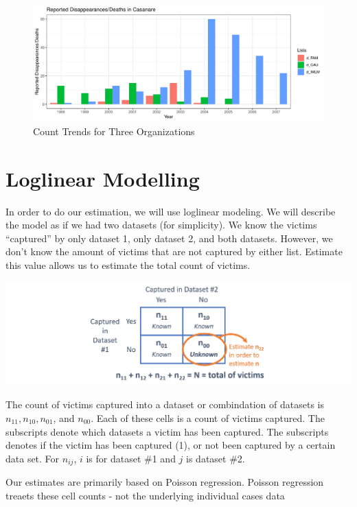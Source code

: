 \documentclass[]{article}
\begin{document}
\begin{figure}
\centering
\includegraphics{Categorical-FinalProject_files/figure-latex/unnamed-chunk-1-1.pdf}
\caption{Count Trends for Three Organizations}
\end{figure}

\hypertarget{loglinear-modelling}{%
\section{Loglinear Modelling}\label{loglinear-modelling}}

In order to do our estimation, we will use loglinear modeling. We will
describe the model as if we had two datasets (for simplicity). We know
the victims ``captured'' by only dataset 1, only dataset 2, and both
datasets. However, we don't know the amount of victims that are not
captured by either list. Estimate this value allows us to estimate the
total count of victims.

\includegraphics{Categorical-FinalProject_files/figure-latex/img.example-1.pdf}

The count of victims captured into a dataset or combindation of datasets
is \(n_{11}, n_{10}, n_{01}\), and \(n_{00}\). Each of these cells is a
count of victims captured. The subscripts denote which datasets a victim
has been captured. The subscripts denotes if the victim has been
captured (1), or not been captured by a certain data set. For
\(n_{ij}\), \(i\) is for dataset \#1 and \(j\) is dataset \#2.

Our estimates are primarily based on Poisson regression. Poisson
regression treaets these cell counts - not the underlying individual
cases data
\end{document}
